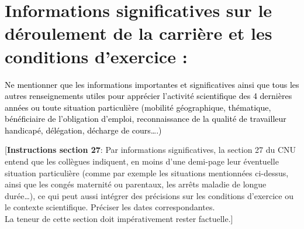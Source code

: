 \documentclass[a4paper,10pt]{article}
\newcommand{\instructionsSection}[1]{{\color{blue}[\textbf{Instructions section 27}: #1]}}
\newcommand{\instructionsSection}[1]{}
\newcommand{\instructions}[1]{\textcolor{black}{#1}}
\begin{document}
\section{Informations significatives sur le déroulement de la carrière et les conditions d'exercice :}

\instructions{Ne mentionner que les informations importantes et significatives ainsi que tous les autres renseignements utiles pour apprécier l'activité scientifique des 4 dernières années ou toute situation particulière (mobilité géographique, thématique, bénéficiaire de l'obligation d'emploi, reconnaissance de la qualité de travailleur handicapé, délégation, décharge de cours….)}

\instructionsSection{Par informations significatives, la section 27 du CNU entend que les collègues indiquent, en moins d'une demi-page leur éventuelle situation particulière (comme par exemple les situations mentionnées ci-dessus, ainsi que les congés maternité ou parentaux, les arrêts maladie de longue durée…), ce qui peut aussi intégrer des précisions sur les conditions d'exercice ou le contexte scientifique. Préciser les dates correspondantes.
\\
La teneur de cette section doit impérativement rester factuelle.}
\end{document}
